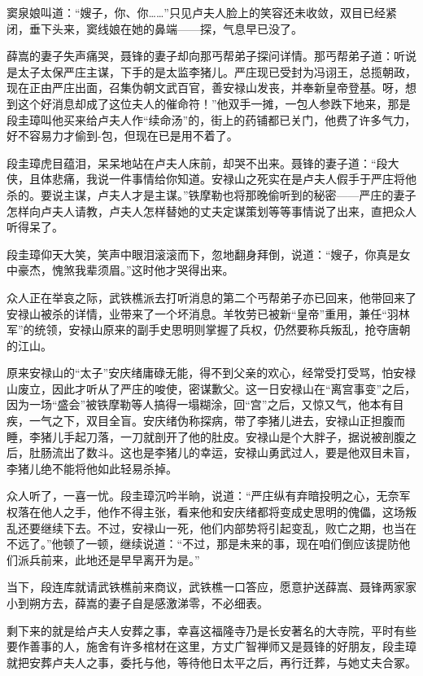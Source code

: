 \documentclass[12pt,oneside]{book}
\begin{document}
窦泉娘叫道：``嫂子，你、你\ldots\ldots{}''只见卢夫人脸上的笑容还未收敛，双目已经紧闭，垂下头来，窦线娘在她的鼻端------探，气息早已没了。

薛嵩的妻子失声痛哭，聂锋的妻子却向那丐帮弟子探问详情。那丐帮弟子道：听说是太子太保严庄主谋，下手的是太监李猪儿。严庄现已受封为冯诩王，总揽朝政，现在正由严庄出面，召集伪朝文武百官，善安禄山发丧，并奉新皇帝登基。呀，想到这个好消息却成了这位夫人的催命符！''他双手一摊，一包人参跌下地来，那是段圭璋叫他买来给卢夫人作``续命汤''的，街上的药铺都已关门，他费了许多气力，好不容易力才偷到-包，但现在已是用不着了。

段圭璋虎目蕴泪，呆呆地站在卢夫人床前，却哭不出来。聂锋的妻子道：``段大侠，且体悲痛，我说一件事情给你知道。安禄山之死实在是卢夫人假手于严庄将他杀的。要说主谋，卢夫人才是主谋。''铁摩勒也将那晚偷听到的秘密------严庄的妻子怎样向卢夫人请教，卢夫人怎样替她的丈夫定谋策划等等事情说了出来，直把众人听得呆了。

段圭璋仰天大笑，笑声中眼泪滚滚而下，忽地翻身拜倒，说道：``嫂子，你真是女中豪杰，愧煞我辈须眉。''这时他才哭得出来。

众人正在举哀之际，武铁樵派去打听消息的第二个丐帮弟子亦已回来，他带回来了安禄山被杀的详情，业带来了一个坏消息。羊牧劳已被新``皇帝''重用，兼任``羽林军''的统领，安禄山原来的副手史思明则掌握了兵权，仍然要称兵叛乱，抢夺唐朝的江山。

原来安禄山的``太子''安庆绪庸碌无能，得不到父亲的欢心，经常受打受骂，怕安禄山废立，因此才听从了严庄的唆使，密谋歉父。这一日安禄山在``离宫事变''之后，因为一场``盛会''被铁摩勒等人搞得一塌糊涂，回``宫''之后，又惊又气，他本有目疾，一气之下，双目全盲。安庆绪伪称探病，带了李猪儿进去，安禄山正担腹而睡，李猪儿手起刀落，一刀就剖开了他的肚皮。安禄山是个大胖子，据说被剖腹之后，肚肠流出了数斗。这也是李猪儿的幸运，安禄山勇武过人，要是他双目未盲，李猪儿绝不能将他如此轻易杀掉。

众人听了，一喜一忧。段圭璋沉吟半晌，说道：``严庄纵有弃暗投明之心，无奈军权落在他人之手，他作不得主张，看来他和安庆绪都将变成史思明的傀儡，这场叛乱还要继续下去。不过，安禄山一死，他们内部势将引起变乱，败亡之期，也当在不远了。''他顿了一顿，继续说道：``不过，那是未来的事，现在咱们倒应该提防他们派兵前来，此地还是早早离开为是。''

当下，段连库就请武铁樵前来商议，武铁樵一口答应，愿意护送薛嵩、聂锋两家家小到朔方去，薛嵩的妻子自是感激涕零，不必细表。

剩下来的就是给卢夫人安葬之事，幸喜这福隆寺乃是长安著名的大寺院，平时有些要作善事的人，施舍有许多棺材在这里，方丈广智禅师又是聂锋的好朋友，段圭璋就把安葬卢夫人之事，委托与他，等待他日太平之后，再行迁葬，与她丈夫合冢。
\end{document}
